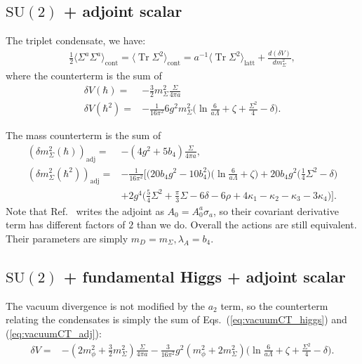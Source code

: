 \documentclass[11pt,a4paper]{article}
\newcommand\Tr{\operatorname{Tr}}
\newcommand\gr[1]{\mathrm{#1}}%
\begin{document}
\subsection{$\gr{SU(2)}$ + adjoint scalar}

The triplet condensate, we have:
\begin{align}
\frac12 \langle \Sigma^a\Sigma^a\rangle_\text{cont} = \langle\Tr \Sigma^2\rangle_\text{cont} = a^{-1} \langle \Tr \Sigma^2 \rangle_\text{latt} + \frac{d(\delta V)}{dm^2_\Sigma},
\end{align}
where the counterterm is the sum of
\begin{align}
\label{eq:vacuumCT_adj}
\delta V(\hbar) =& -\frac32 m^2_\Sigma \frac{\Sigma}{4\pi a} \nonumber \\
\delta V(\hbar^2) =& -\frac{1}{16\pi^2} 6g^2 m^2_\Sigma \Big( \ln \frac{6}{a \Lambda} +\zeta + \frac{\Sigma^2}{4} - \delta\Big).
\end{align}

The mass counterterm is the sum of
\begin{align}
(\delta m^2_\Sigma(\hbar))_\text{adj} =& -(4g^2 + 5 b_4) \frac{\Sigma}{4\pi a}, \\
(\delta m^2_\Sigma(\hbar^2))_\text{adj} =& -\frac{1}{16\pi^2} \Big[ \Big( 20 b_4 g^2 - 10 b^2_4 \Big)\Big( \ln\frac{6}{a \Lambda} + \zeta \Big) +20 b_4 g^2 \Big( \frac14 \Sigma^2 - \delta \Big) \nonumber \\
 &+ 2 g^4 \Big( \frac54 \Sigma^2 + \frac{\pi}{3}\Sigma - 6\delta -6\rho + 4\kappa_1 -\kappa_2 - \kappa_3 - 3\kappa_4 \Big) \Big].
\end{align}
Note that Ref.~\cite{Laine:1995np} writes the adjoint as $A_0 = A^a_0 \sigma_a$, so their covariant derivative term has different factors of $2$ than we do. Overall the actions are still equivalent. Their parameters are simply $m_D = m_\Sigma, \lambda_A = b_4$.


\subsection{$\gr{SU(2)}$ + fundamental Higgs + adjoint scalar}

The vacuum divergence is not modified by the $a_2$ term, so the counterterm relating the condensates is simply the sum of Eqs.~(\ref{eq:vacuumCT_higgs}) and (\ref{eq:vacuumCT_adj}):
\begin{align}
\delta V =& - ( 2 m^2_\phi + \frac32 m^2_\Sigma ) \frac{\Sigma}{4\pi a} - \frac{3}{16\pi^2} g^2 ( m^2_\phi + 2 m^2_\Sigma ) \Big( \ln \frac{6}{a \Lambda} +\zeta + \frac{\Sigma^2}{4} - \delta \Big).
\end{align}
\end{document}
